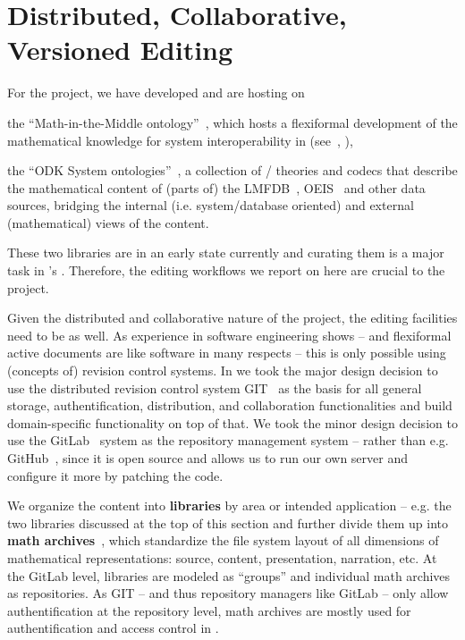 \section{Distributed, Collaborative, Versioned Editing}\label{sec:editing}

For the \pn project, we have developed and are hosting on \sys
\begin{compactenum}
\item the ``Math-in-the-Middle ontology''~\cite{MitM:on}, which hosts a flexiformal
  development of the mathematical knowledge for system interoperability in \pn
  (see~\cite{DehKohKon:iop16}, ),
\item the ``ODK System ontologies''~\cite{ODKsysonto:on}, a collection of \omdoc/\mmt
  theories and codecs that describe the mathematical content of (parts of) the
  LMFDB~\cite{lmfdb:on}, OEIS~\cite{oeis} and other data sources, bridging the internal
  (i.e. system/database oriented) and external (mathematical) views of the content.
\end{compactenum}
These two \sys libraries are in an early state currently and curating them is a major task
in \pn's . Therefore, the editing workflows we
report on here are crucial to the \pn project.

Given the distributed and collaborative nature of the \pn project, the editing facilities
need to be as well. As experience in software engineering shows -- and flexiformal active
documents are like software in many respects -- this is only possible using (concepts of)
revision control systems. In \sys we took the major design decision to use the distributed
revision control system GIT~\cite{GIT:on} as the basis for all general storage,
authentification, distribution, and collaboration functionalities and build
domain-specific functionality on top of that. We took the minor design decision to use the
GitLab~\cite{GitLab:on} system as the repository management system -- rather than e.g.
GitHub~\cite{GitHub:on}, since it is open source and allows us to run our own server and
configure it more by patching the code.

We organize the content into \textbf{libraries} by area or intended application --
e.g. the two libraries discussed at the top of this section and further divide them up
into \textbf{math archives}~\cite{HorIacJuc:cscpnrr11}, which standardize the file system
layout of all dimensions of mathematical representations: source, content, presentation,
narration, etc. At the GitLab level, libraries are modeled as ``groups'' and individual
math archives as repositories. As GIT -- and thus repository managers like GitLab -- only
allow authentification at the repository level, math archives are mostly used for
authentification and access control in \sys.

